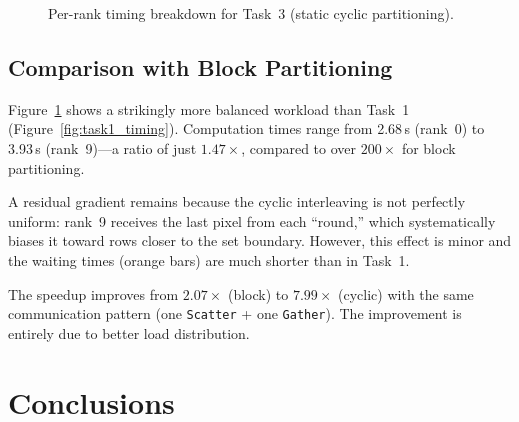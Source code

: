 \documentclass[11pt,a4paper]{article}
\begin{document}
\begin{figure}[h]\centering
{}
\caption{Per-rank timing breakdown for Task~3 (static cyclic partitioning).}
\label{fig:task3_timing}
\end{figure}

\subsection{Comparison with Block Partitioning}

Figure~\ref{fig:task3_timing} shows a strikingly more balanced workload
than Task~1 (Figure~\ref{fig:task1_timing}). Computation times range from
2.68\,s (rank~0) to 3.93\,s (rank~9)---a ratio of just $1.47\times$,
compared to over $200\times$ for block partitioning.

A residual gradient remains because the cyclic interleaving is not perfectly
uniform: rank~9 receives the last pixel from each ``round,'' which
systematically biases it toward rows closer to the set boundary. However,
this effect is minor and the waiting times (orange bars) are much shorter
than in Task~1.

The speedup improves from $2.07\times$ (block) to $7.99\times$ (cyclic)
with the same communication pattern (one \texttt{Scatter} + one
\texttt{Gather}). The improvement is entirely due to better load
distribution.

\section{Conclusions}
\label{sec:conclusions}
\end{document}
